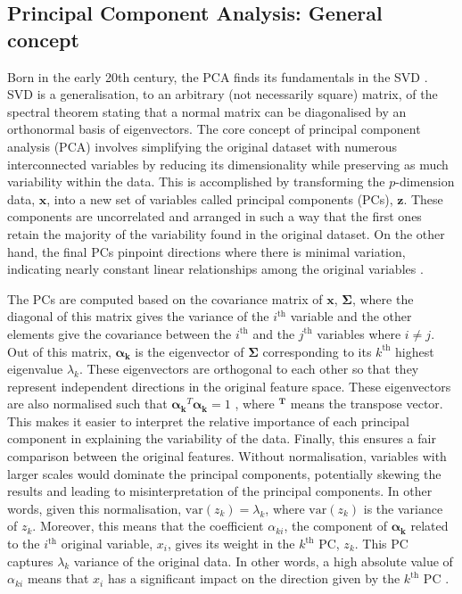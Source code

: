 \subsection{Principal Component Analysis: General concept}
\label{subsec:meth:PCA:PCA}
Born in the early 20th century, the \acrfull{PCA} finds its fundamentals in the \gls{SVD} \cite{pearson1901on,hotelling1933analysis}. \gls{SVD} is a generalisation, to an arbitrary (\ie not necessarily square) matrix, of the spectral theorem stating that a normal matrix can be diagonalised by an orthonormal basis of eigenvectors.  The core concept of principal component analysis (PCA) involves simplifying the original dataset with numerous interconnected variables by reducing its dimensionality while preserving as much variability within the data. This is accomplished by transforming the $p$-dimension data, $\mathbf{x}$, into a new set of variables called principal components (PCs), $\mathbf{z}$. These components are uncorrelated and arranged in such a way that the first ones retain the majority of the variability found in the original dataset. On the other hand, the final PCs pinpoint directions where there is minimal variation, indicating nearly constant linear relationships among the original variables \cite{jolliffe2002principal}. 

The PCs are computed based on the covariance matrix of $\mathbf{x}$, $\mathbf{\Sigma}$, where the diagonal of this matrix gives the variance of the $i^{\text{th}}$ variable and the other elements give the covariance between the $i^{\text{th}}$ and the $j^{\text{th}}$ variables where $i\neq j$. Out of this matrix, $\mathbf{\alpha_k}$ is the eigenvector of $\mathbf{\Sigma}$ corresponding to its $k^{\text{th}}$ highest eigenvalue $\lambda_k$. These eigenvectors are orthogonal to each other so that they represent independent directions in the original feature space. These eigenvectors are also normalised such that $\mathbf{\alpha_k}^{T}\mathbf{\alpha_k}=1$ \cite{jolliffe2002principal}, where $\mathbf{^T}$ means the transpose vector. This makes it easier to interpret the relative importance of each principal component in explaining the variability of the data. Finally, this ensures a fair comparison between the original features. Without normalisation, variables with larger scales would dominate the principal components, potentially skewing the results and leading to misinterpretation of the principal components. In other words, given this normalisation, $\mathrm{var}\left(z_k\right)=\lambda_k$, where $\mathrm{var}\left(z_k\right)$ is the variance of $z_k$. Moreover, this means that the coefficient $\alpha_{ki}$, \ie the component of $ \mathbf{\alpha_k}$ related to the $i^{\text{th}}$ original variable, $x_i$,  gives its weight in the $k^{\text{th}}$ PC, \ie $z_k$. This PC captures $\lambda_k$ variance of the original data. In other words, a high absolute value of $\alpha_{ki}$ means that $x_i$ has a significant impact on the direction given by the $k^{\text{th}}$ PC \cite{zdybal2022advancing}. 

